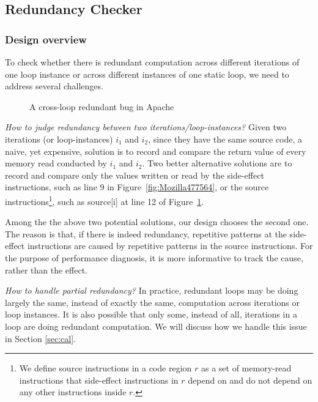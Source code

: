 \subsection{Redundancy Checker}
\label{sec:redundant}

\subsubsection{Design overview}
To check whether there is redundant computation across different iterations
of one loop instance or across different instances of one static loop, we need
to address several challenges.

\begin{figure}
  \centering
  \mbox{}
  \caption{A cross-loop redundant bug in Apache}
  \label{fig:Apache34464}
\end{figure}

\emph{How to judge redundancy between two iterations/loop-instances?}
Given two iterations (or loop-instances) $i_1$ and $i_2$, since they have 
the same source code, 
a naive, yet expensive, solution is to record and compare the return value of
every memory read conducted by $i_1$ and $i_2$. Two better alternative
solutions are to record and compare only the values written or read by the
side-effect instructions, such as 
line 9 in Figure~\ref{fig:Mozilla477564},
or the source instructions\footnote{We define source instructions in a code
region $r$ as a set of memory-read instructions that side-effect
instructions in $r$ depend on and do not depend on any other instructions
inside $r$.}, 
such as source[i] at line 12 of Figure~\ref{fig:Apache34464}.

Among the the above two potential solutions, our design chooses the second one.
The reason is that, if there is indeed
redundancy, repetitive patterns at the side-effect instructions are caused by
repetitive patterns in the source instructions.
For the purpose of performance diagnosis, it is
more informative to track the cause, rather than the effect.

\emph{How to handle partial redundancy?}
In practice, redundant loops may be doing largely the same, instead of exactly
the same, computation across iterations or loop instances. It is also possible
that only some, instead of all, iterations in a loop are doing redundant
computation. We will discuss how we handle this issue in Section \ref{sec:cal}.



